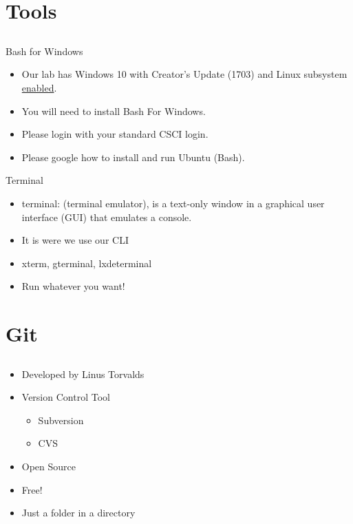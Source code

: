 \documentclass{beamer}
\begin{document}
\section{Tools}
\subsection{}

\begin{frame}{Bash for Windows}
\begin{itemize}
\item Our lab has Windows 10 with Creator's Update (1703) and Linux subsystem \underline{enabled}.
\item You will need to install Bash For Windows.
\item Please login with your standard CSCI login.
\item Please google how to install and run Ubuntu (Bash).
\end{itemize}
\end{frame}

\begin{frame}{Terminal}
\begin{itemize}
\item terminal: (terminal emulator), is a text-only window in a graphical user interface (GUI) that emulates a console. 
\item It is were we use our CLI
\item xterm, gterminal, lxdeterminal
\item Run whatever you want!
\end{itemize}
\end{frame}

\section{Git}
\subsection{}
\begin{frame}{}
\begin{itemize}
\item Developed by Linus Torvalds
\item Version Control Tool
\begin{itemize}
\item Subversion
\item CVS
\end{itemize}
\item Open Source 
\item Free!
\item Just a folder in a directory
\end{itemize}
\end{frame}
\end{document}
